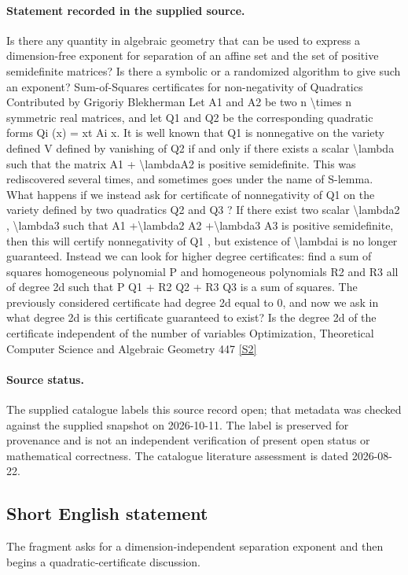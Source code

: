 \documentclass[11pt]{article}
\begin{document}
\paragraph{Statement recorded in the supplied source.}
Is there any quantity in algebraic geometry that can be used to express a dimension-free exponent for separation of an aﬃne set and the set of positive semideﬁnite matrices? Is there a symbolic or a randomized algorithm to give such an exponent? Sum-of-Squares certificates for non-negativity of Quadratics Contributed by Grigoriy Blekherman Let A1 and A2 be two n \textbackslash{}times n symmetric real matrices, and let Q1 and Q2 be the corresponding quadratic forms Qi (x) = xt Ai x. It is well known that Q1 is nonnegative on the variety deﬁned V deﬁned by vanishing of Q2 if and only if there exists a scalar \textbackslash{}lambda such that the matrix A1 + \textbackslash{}lambdaA2 is positive semideﬁnite. This was rediscovered several times, and sometimes goes under the name of S-lemma. What happens if we instead ask for certiﬁcate of nonnegativity of Q1 on the variety deﬁned by two quadratics Q2 and Q3 ? If there exist two scalar \textbackslash{}lambda2 , \textbackslash{}lambda3 such that A1 +\textbackslash{}lambda2 A2 +\textbackslash{}lambda3 A3 is positive semideﬁnite, then this will certify nonnegativity of Q1 , but existence of \textbackslash{}lambdai is no longer guaranteed. Instead we can look for higher degree certificates: ﬁnd a sum of squares homogeneous polynomial P and homogeneous polynomials R2 and R3 all of degree 2d such that P Q1 + R2 Q2 + R3 Q3 is a sum of squares. The previously considered certiﬁcate had degree 2d equal to 0, and now we ask in what degree 2d is this certiﬁcate guaranteed to exist? Is the degree 2d of the certiﬁcate independent of the number of variables Optimization, Theoretical Computer Science and Algebraic Geometry 447 \href{https://doi.org/10.4171/owr/2025/9}{[S2]}
\paragraph{Source status.}
The supplied catalogue labels this source record open; that metadata was checked against the supplied snapshot on 2026-10-11. The label is preserved for provenance and is not an independent verification of present open status or mathematical correctness. The catalogue literature assessment is dated 2026-08-22.
\subsection{Short English statement}
The fragment asks for a dimension-independent separation exponent and then begins a quadratic-certificate discussion.
\end{document}
